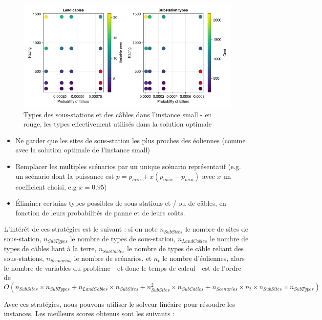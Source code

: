 \documentclass[a4paper,12pt]{article}
\begin{document}
\begin{figure}[h]
    \centering
    \includegraphics[scale=0.5]{small-types.png}
    \caption{Types des sous-stations et des câbles dans l'instance small - en rouge, les types effectivement utilisés dans la solution optimale}
\end{figure}

\begin{itemize}
    \item Ne garder que les sites de sous-station les plus proches des éoliennes (comme avec la solution optimale de l'instance small)
    \item Remplacer les multiples scénarios par un unique scénario représentatif (e.g. un scénario dont la puissance est $p = p_{min} + x(p_{max} - p_{min})$ avec $x$ un coefficient choisi, e.g $x = 0.95$)
    \item Éliminer certains types possibles de sous-stations et / ou de câbles, en fonction de leurs probabilités de panne et de leurs coûts.
\end{itemize}

L'intérêt de ces stratégies est le suivant : si on note $n_{SubSites}$ le nombre de sites de sous-station, $n_{SubTypes}$ le nombre de types de sous-station, $n_{LandCables}$ le nombre de types de câbles liant à la terre, $n_{SubCables}$ le nombre de types de câble reliant des sous-stations, $n_{Scenarios}$ le nombre de scénarios, et $n_{t}$ le nombre d'éoliennes, alors le nombre de variables du problème - et donc le temps de calcul - est de l'ordre de 
$$ O(n_{SubSites} \times n_{SubTypes} + n_{LandCables} \times n_{SubSites} + n_{SubSites}^2 \times n_{SubCables} + n_{Scenarios} \times n_{t} \times n_{SubSites} \times n_{SubTypes}) $$

Avec ces stratégies, nous pouvons utiliser le solveur linéaire pour résoudre les instances. Les meilleurs scores obtenus sont les suivants :
\end{document}
